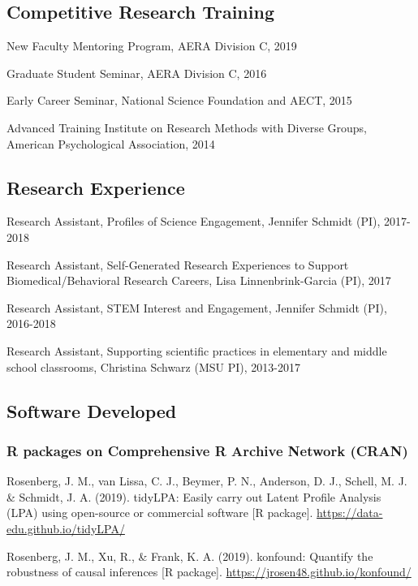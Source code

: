 \documentclass[14,]{article}
\begin{document}
\subsection{Competitive Research
Training}\label{competitive-research-training}

New Faculty Mentoring Program, AERA Division C, 2019

Graduate Student Seminar, AERA Division C, 2016

Early Career Seminar, National Science Foundation and AECT, 2015

Advanced Training Institute on Research Methods with Diverse Groups,
American Psychological Association, 2014

\subsection{Research Experience}\label{research-experience}

Research Assistant, Profiles of Science Engagement, Jennifer Schmidt
(PI), 2017-2018

Research Assistant, Self-Generated Research Experiences to Support
Biomedical/Behavioral Research Careers, Lisa Linnenbrink-Garcia (PI),
2017

Research Assistant, STEM Interest and Engagement, Jennifer Schmidt (PI),
2016-2018

Research Assistant, Supporting scientific practices in elementary and
middle school classrooms, Christina Schwarz (MSU PI), 2013-2017

\subsection{Software Developed}\label{software-developed}

\subsubsection{R packages on Comprehensive R Archive Network
(CRAN)}\label{r-packages-on-comprehensive-r-archive-network-cran}

Rosenberg, J. M., van Lissa, C. J., Beymer, P. N., Anderson, D. J.,
Schell, M. J. \& Schmidt, J. A. (2019). tidyLPA: Easily carry out Latent
Profile Analysis (LPA) using open-source or commercial software {[}R
package{]}. \url{https://data-edu.github.io/tidyLPA/}

Rosenberg, J. M., Xu, R., \& Frank, K. A. (2019). konfound: Quantify the
robustness of causal inferences {[}R package{]}.
\url{https://jrosen48.github.io/konfound/}
\end{document}

